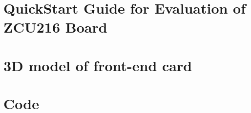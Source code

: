 \section{QuickStart Guide for Evaluation of ZCU216 Board}
\section{3D model of front-end card}
\section{Code}

